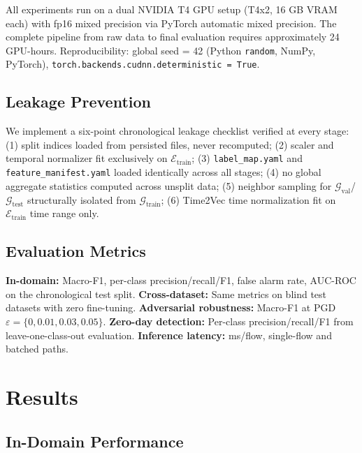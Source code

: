 \documentclass[compsoc,journal]{IEEEtran}
\begin{document}
All experiments run on a dual NVIDIA T4 GPU setup (T4x2, 16 GB VRAM each) with fp16 mixed precision via PyTorch automatic mixed precision. The complete pipeline from raw data to final evaluation requires approximately 24 GPU-hours. Reproducibility: global seed = 42 (Python \texttt{random}, NumPy, PyTorch), \texttt{torch.backends.cudnn.deterministic = True}.

\subsection{Leakage Prevention}

We implement a six-point chronological leakage checklist verified at every stage: (1) split indices loaded from persisted files, never recomputed; (2) scaler and temporal normalizer fit exclusively on $\mathcal{E}_{\text{train}}$; (3) \texttt{label\_map.yaml} and \texttt{feature\_manifest.yaml} loaded identically across all stages; (4) no global aggregate statistics computed across unsplit data; (5) neighbor sampling for $\mathcal{G}_{\text{val}}$/$\mathcal{G}_{\text{test}}$ structurally isolated from $\mathcal{G}_{\text{train}}$; (6) Time2Vec time normalization fit on $\mathcal{E}_{\text{train}}$ time range only.

\subsection{Evaluation Metrics}

\textbf{In-domain:} Macro-F1, per-class precision/recall/F1, false alarm rate, AUC-ROC on the chronological test split. \textbf{Cross-dataset:} Same metrics on blind test datasets with zero fine-tuning. \textbf{Adversarial robustness:} Macro-F1 at PGD $\varepsilon = \{0, 0.01, 0.03, 0.05\}$. \textbf{Zero-day detection:} Per-class precision/recall/F1 from leave-one-class-out evaluation. \textbf{Inference latency:} ms/flow, single-flow and batched paths.

\section{Results}

\subsection{In-Domain Performance}
\end{document}
